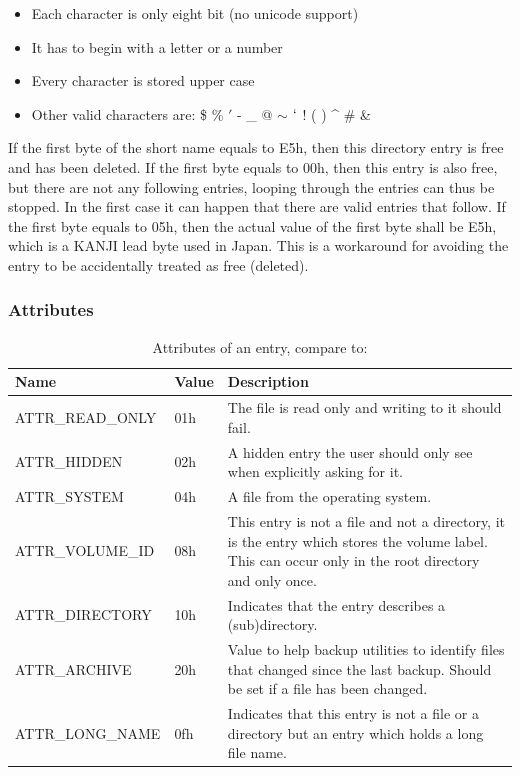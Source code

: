 \begin{itemize}
\item Each character is only eight bit (no unicode support)
\item It has to begin with a letter or a number
\item Every character is stored upper case
\item Other valid characters are: \$ \% $'$ -  \_ @ $\sim$ $`$ ! ( ) { } \^{} \# \&
\end{itemize}

If the first byte of the short name equals to E5h, then this directory entry is free and has been deleted. If the first byte equals to 00h, then this entry is also free, but there are not any following entries, looping through the entries can thus be stopped. In the first case it can happen that there are valid entries that follow. If the first byte equals to 05h, then the actual value of the first byte shall be E5h, which is a KANJI lead byte used in Japan. This is a workaround for avoiding the entry to be accidentally treated as free (deleted).

\subsubsection{Attributes}

\begin{table}[!ht]
\caption{Attributes of an entry, compare to: \cite{usb_ms_jan, fatgen103}}
\centering
\begin{tabular}{|l|l|p{9cm}|}
\hline\hline
\textbf{Name} & \textbf{Value}  & \textbf{Description}\\ \hline
ATTR\_READ\_ONLY & 01h & The file is read only and writing to it should fail. \\ \hline
ATTR\_HIDDEN & 02h & A hidden entry the user should only see when explicitly asking for it. \\ \hline
ATTR\_SYSTEM & 04h & A file from the operating system. \\ \hline
ATTR\_VOLUME\_ID & 08h & This entry is not a file and not a directory, it is the entry which stores the volume label. This can occur only in the root directory and only once. \\ \hline
ATTR\_DIRECTORY & 10h & Indicates that the entry describes a (sub)directory. \\ \hline
ATTR\_ARCHIVE & 20h & Value to help backup utilities to identify files that changed since the last backup. Should be set if a file has been changed. \\ \hline
ATTR\_LONG\_NAME & 0fh & Indicates that this entry is not a file or a directory but an entry which holds a long file name. \\ \hline
\end{tabular}
\label{table:fat_dir_entry_attr}
\end{table}

